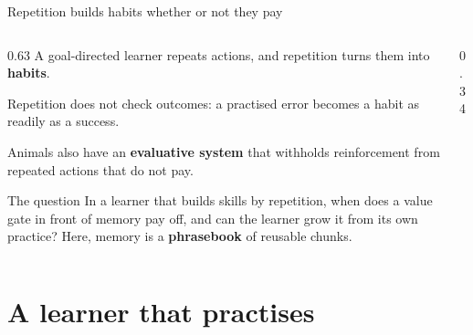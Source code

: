 \documentclass[aspectratio=169,11pt]{beamer}
\newcommand{\hltext}[1]{\textcolor{mainblue}{\textbf{#1}}}
\newcommand{\warmtext}[1]{\textcolor{gateorange}{\textbf{#1}}}
\newcommand{\dimtext}[1]{\textcolor{grayout}{#1}}
\newcommand{\passmark}{\textcolor{passc}{\ding{51}}}
\newcommand{\AttP}[2]{\node[att, draw=passc, fill=passc!10] at (#1,#2) {\passmark};}
\begin{document}
\begin{frame}{Repetition builds habits whether or not they pay}
\begin{columns}[T]
\begin{column}{0.63\textwidth}
{\small A goal-directed learner repeats actions, and repetition turns them into \hltext{habits}.}

\smallskip
{\small Repetition does not check outcomes: a practised error becomes a habit as readily as a success.}

\smallskip
{\small Animals also have an \warmtext{evaluative system} that withholds reinforcement from repeated actions that do not pay.}

\smallskip
\begin{alertblock}{The question}
{\small In a learner that builds skills by repetition, when does a value gate in front of memory pay off, and can the learner grow it from its own practice? Here, memory is a \textbf{phrasebook} of reusable chunks.}
\end{alertblock}
\end{column}

\begin{column}{0.34\textwidth}
\centering
{}
\end{column}
\end{columns}
\end{frame}

\section{A learner that practises}
\end{document}
